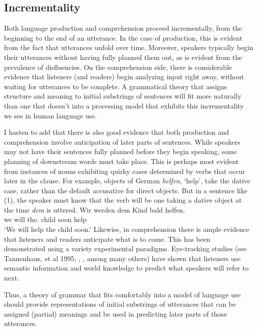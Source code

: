 \documentclass[a4paper]{article}
\begin{document}
\subsection{Incrementality}

Both language production and comprehension proceed incrementally, from the beginning to the end of an utterance.  In the case of production, this is evident from the fact that utterances unfold over time.  Moreover, speakers typically begin their utterances without having fully planned them out, as is evident from the prevalence of disfluencies.  On the comprehension side, there is considerable evidence that listeners (and readers) begin analyzing input right away, without waiting for utterances to be complete.  A grammatical theory that assigns structure and meaning to initial substrings of sentences will fit more naturally than one that doesn't into a processing model that exhibits this incrementality we see in human language use.  

I hasten to add that there is also good evidence that both production and comprehension involve anticipation of later parts of sentences.  While speakers may not have their sentences fully planned before they begin speaking, some planning of downstream words must take place.  This is perhaps most evident from instances of nouns exhibiting quirky cases determined by verbs that occur later in the clause.  For example, objects of German {\it helfen}, `help', take the dative case, rather than the default accusative for direct objects.  But in a sentence like (1), the speaker must know that the verb will be one taking a dative object at the time {\it dem} is uttered.
\ea
\gll Wir werden dem        Kind bald helfen.\\
     we will    the.\DAT{} child soon help\\\german
\glt `We will help the child soon.'
\z
Likewise, in comprehension there is ample evidence that listeners and readers anticipate what is to come.  This has been demonstrated using a variety experimental paradigms.  Eye-tracking studies (see Tannenhaus, et al 1995, \citealt{AltmannKamide99}, \citealt{ArnoldEtal2007}, among many others) have shown that listeners use semantic information and world knowledge to predict what speakers will refer to next.

Thus, a theory of grammar that fits comfortably into a model of language use should provide representations of initial substrings of utterances that can be assigned (partial) meanings and be used in predicting later parts of those utterances.
\end{document}
